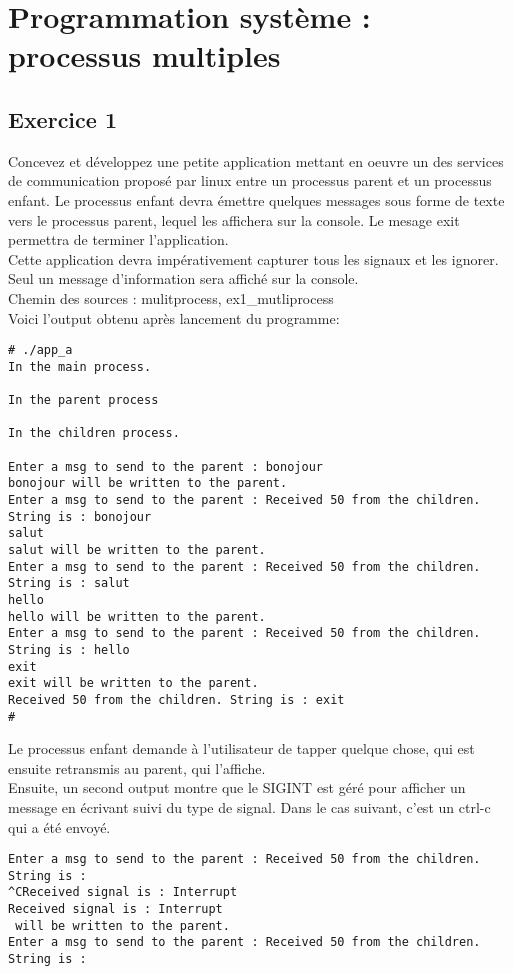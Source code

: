 \section{Programmation système : processus multiples}
\subsection{Exercice 1}
Concevez et développez une petite application mettant en oeuvre un des services de communication proposé par linux entre un processus parent et un processus enfant.
Le processus enfant devra émettre quelques messages sous forme de texte vers le processus parent, lequel les affichera sur la console. Le mesage exit permettra de terminer l'application.\\
Cette application devra impérativement capturer tous les signaux et les ignorer. Seul un message d'information sera affiché sur la console.\\
Chemin des sources : mulitprocess, ex1_mutliprocess\\
Voici l'output obtenu après lancement du programme:
\begin{lstlisting}
# ./app_a 
In the main process.

In the parent process

In the children process.

Enter a msg to send to the parent : bonojour
bonojour will be written to the parent.
Enter a msg to send to the parent : Received 50 from the children. String is : bonojour
salut
salut will be written to the parent.
Enter a msg to send to the parent : Received 50 from the children. String is : salut
hello
hello will be written to the parent.
Enter a msg to send to the parent : Received 50 from the children. String is : hello
exit
exit will be written to the parent.
Received 50 from the children. String is : exit
#
\end{lstlisting}
Le processus enfant demande à l'utilisateur de tapper quelque chose, qui est ensuite retransmis au parent, qui l'affiche. \\
Ensuite, un second output montre que le SIGINT est géré pour afficher un message en écrivant  suivi du type de signal. Dans le cas suivant, c'est un ctrl-c qui a été envoyé. 
\begin{lstlisting}
Enter a msg to send to the parent : Received 50 from the children. String is : 
^CReceived signal is : Interrupt
Received signal is : Interrupt
 will be written to the parent.
Enter a msg to send to the parent : Received 50 from the children. String is : 
\end{lstlisting}

